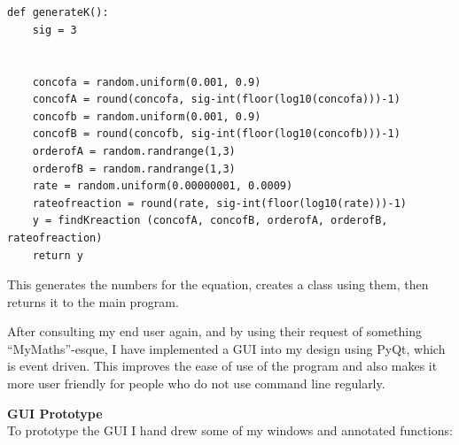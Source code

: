 \documentclass[a4paper,12pt]{report}
\begin{document}
\begin{verbatim}


def generateK():
    sig = 3
    
    
    concofa = random.uniform(0.001, 0.9)
    concofA = round(concofa, sig-int(floor(log10(concofa)))-1)
    concofb = random.uniform(0.001, 0.9)
    concofB = round(concofb, sig-int(floor(log10(concofb)))-1)
    orderofA = random.randrange(1,3)
    orderofB = random.randrange(1,3)
    rate = random.uniform(0.00000001, 0.0009)
    rateofreaction = round(rate, sig-int(floor(log10(rate)))-1)
    y = findKreaction (concofA, concofB, orderofA, orderofB, rateofreaction)
    return y
\end{verbatim}
\begin{flushleft}

This generates the numbers for the equation, creates a class using them, then returns it to the main program.
\par
After consulting my end user again, and by using their request of something “MyMaths”-esque, I have implemented a GUI into my design using PyQt, which is event driven. This improves the ease of use of the program and also makes it more user friendly for people who do not use command line regularly.

\textbf{GUI Prototype}\\
To prototype the GUI I hand drew some of my windows and annotated functions:
\end{flushleft}
\end{document}
